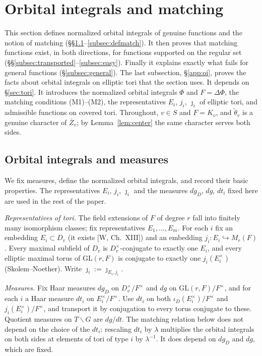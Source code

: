 \documentclass[12pt]{article}
\newcommand{\ov}[1]{\overline{#1}}
\newcommand{\GL}{\mathrm{GL}}
\newcommand{\Zb}{\ov{Z}}
\newcommand{\iD}{\iota_D}
\newcommand{\jj}{\jmath}
\theoremstyle{plain}
\theoremstyle{definition}
\begin{document}
\section{Orbital integrals and matching}\label{sec:matching}
This section defines normalized orbital integrals of genuine functions and the notion of matching (\S\S\ref{subsec:oi}--\ref{subsec:defmatch}). It then proves that matching functions exist, in both directions, for functions supported on the regular set (\S\S\ref{subsec:transported}--\ref{subsec:easy}). Finally it explains exactly what fails for general functions (\S\ref{subsec:general}). The last subsection, \S\ref{app:oi}, proves the facts about orbital integrals on elliptic tori that the section uses. It depends on \S\ref{sec:tori}. It introduces the normalized orbital integrals $\Phi$ and $F=\Delta\Phi$, the matching conditions (M1)--(M2), the representatives $E_i$, $j_i$, $\jj_i$ of elliptic tori, and admissible functions on covered tori. Throughout, $v\in S$ and $F=K_v$, and $\tilde\theta_v$ is a genuine character of $\Zb_v$; by Lemma~\ref{lem:center} the same character serves both sides.

\subsection{Orbital integrals and measures}\label{subsec:oi}
We fix measures, define the normalized orbital integrals, and record their basic properties. The representatives $E_i$, $j_i$, $\jj_i$ and the measures $dg_D$, $dg$, $dt_i$ fixed here are used in the rest of the paper.

\emph{Representatives of tori.} The field extensions of $F$ of degree $r$ fall into finitely many isomorphism classes; fix representatives $E_1,\dots,E_m$. For each $i$ fix an embedding $E_i\subset D_v$ (it exists [W, Ch.~XIII]) and an embedding $j_i:E_i\hookrightarrow M_r(F)$. Every maximal subfield of $D_v$ is $D_v^\times$-conjugate to exactly one $E_i$, and every elliptic maximal torus of $\GL(r,F)$ is conjugate to exactly one $j_i(E_i^\times)$ (Skolem--Noether). Write $\jj_i:=\jj_{E_i,j_i}$.

\emph{Measures.} Fix Haar measures $dg_D$ on $D_v^\times/F^\times$ and $dg$ on $\GL(r,F)/F^\times$, and for each $i$ a Haar measure $dt_i$ on $E_i^\times/F^\times$. Use $dt_i$ on both $\iD(E_i^\times)/F^\times$ and $j_i(E_i^\times)/F^\times$, and transport it by conjugation to every torus conjugate to these. Quotient measures on $T\backslash G$ are $dg/dt$. The matching relation below does not depend on the choice of the $dt_i$: rescaling $dt_i$ by $\lambda$ multiplies the orbital integrals on both sides at elements of tori of type $i$ by $\lambda^{-1}$. It does depend on $dg_D$ and $dg$, which are fixed.
\end{document}
